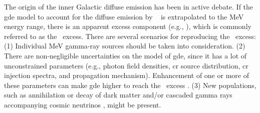 \documentclass[a4paper,11pt]{article}
\begin{document}
The origin of the inner Galactic diffuse emission has been in active debate. 
If the \ac{gde} model to account for the diffuse emission by \lat\ \cite{ackermann_fermi_2012} is extrapolated to the MeV energy range, 
there is an apparent excess component (e.g., \cite{strong_diffuse_2004}), which is commonly referred to as the \comptel\ excess.
There are several scenarios for reproducing the \comptel\ excess:
(1) Individual MeV gamma-ray sources should be taken into consideration. 
(2) There are non-negligible uncertainties on the model of \ac{gde}, since it has a lot of unconstrained parameters (e.g., photon field densities, \ac{cr} source distribution, \ac{cr} injection spectra, and propagation mechanism).
Enhancement of one or more of these parameters can make \ac{gde} higher to reach the \comptel\ excess \citep{bouchet_diffuse_2011}.
(3) New populations, such as annihilation or decay of dark matter \citep{boddy_indirect_2015} and/or cascaded gamma rays accompanying cosmic neutrinos \citep{fang_tev_2022}, might be present.
\end{document}
